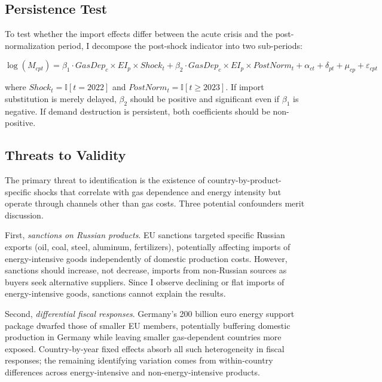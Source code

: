 \documentclass[12pt]{article}
\newcommand{\ind}{\mathbb{I}}
\begin{document}
\subsection{Persistence Test}

To test whether the import effects differ between the acute crisis and the post-normalization period, I decompose the post-shock indicator into two sub-periods:

\begin{equation}
\log(M_{cpt}) = \beta_1 \cdot GasDep_c \times EI_p \times Shock_t + \beta_2 \cdot GasDep_c \times EI_p \times PostNorm_t + \alpha_{ct} + \delta_{pt} + \mu_{cp} + \varepsilon_{cpt}
\label{eq:persistence}
\end{equation}

\noindent where $Shock_t = \ind[t = 2022]$ and $PostNorm_t = \ind[t \geq 2023]$. If import substitution is merely delayed, $\beta_2$ should be positive and significant even if $\beta_1$ is negative. If demand destruction is persistent, both coefficients should be non-positive.

\subsection{Threats to Validity}

The primary threat to identification is the existence of country-by-product-specific shocks that correlate with gas dependence and energy intensity but operate through channels other than gas costs. Three potential confounders merit discussion.

First, \textit{sanctions on Russian products}. EU sanctions targeted specific Russian exports (oil, coal, steel, aluminum, fertilizers), potentially affecting imports of energy-intensive goods independently of domestic production costs. However, sanctions should increase, not decrease, imports from non-Russian sources as buyers seek alternative suppliers. Since I observe declining or flat imports of energy-intensive goods, sanctions cannot explain the results.

Second, \textit{differential fiscal responses}. Germany's 200 billion euro energy support package dwarfed those of smaller EU members, potentially buffering domestic production in Germany while leaving smaller gas-dependent countries more exposed. Country-by-year fixed effects absorb all such heterogeneity in fiscal responses; the remaining identifying variation comes from within-country differences across energy-intensive and non-energy-intensive products.
\end{document}
